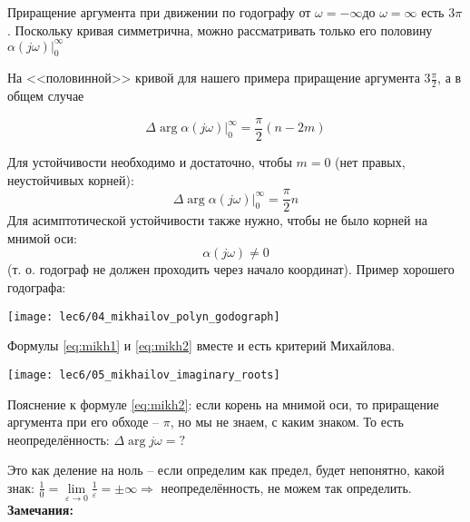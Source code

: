 \documentclass[main.tex]{subfiles}
\begin{document}
Приращение аргумента при движении по годографу от $ \omega = - \infty $до $ \omega = \infty $ есть $ 3 \pi $.
Поскольку кривая симметрична, можно рассматривать только его половину $ \alpha(j \omega) |_0^\infty $

На <<половинной>> кривой для нашего примера приращение аргумента $ 3\frac{\pi}{2} $, а в общем случае

\begin{equation}\label{eq:mikhailov}
	\boxed{ \Delta \arg \alpha (j \omega) |_0^\infty = \frac{\pi}{2} (n - 2m) }
\end{equation}

Для устойчивости необходимо и достаточно, чтобы $ m = 0 $ (нет правых, неустойчивых корней):
\begin{equation}\label{eq:mikh1}
\boxed{ \Delta \arg \alpha(j \omega) |_0^\infty = \frac{\pi}{2} n }
\end{equation}
Для асимптотической устойчивости также нужно, чтобы не было корней на мнимой оси:
\begin{equation}\label{eq:mikh2}
	\boxed{ \alpha(j \omega) \ne 0 }
\end{equation}
(т. о. годограф не должен проходить через начало координат). Пример хорошего годографа:

\texttt{[image: lec6/04\_mikhailov\_polyn\_godograph]}

Формулы \eqref{eq:mikh1} и \eqref{eq:mikh2} вместе и есть критерий Михайлова.

\texttt{[image: lec6/05\_mikhailov\_imaginary\_roots]}

Пояснение к формуле \eqref{eq:mikh2}:
если корень на мнимой оси, то приращение аргумента при его обходе -- $\pi$, но мы не знаем, с каким знаком.
То есть неопределённость: $ \Delta \arg j \omega = ? $

Это как деление на ноль -- если определим как предел, будет непонятно, какой знак: $ \frac{1}{0} = \lim\limits_{\varepsilon \to 0} \frac{1}{\varepsilon} = \pm \infty \Rightarrow $ неопределённость, не можем так определить. \\

\textbf{Замечания:}
\end{document}
